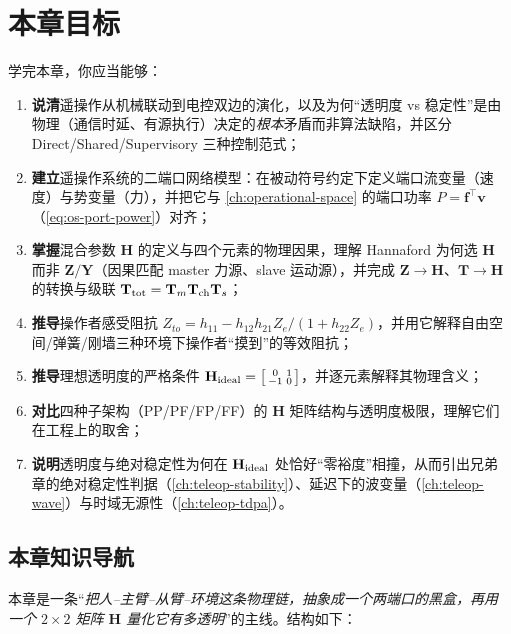 \section*{本章目标}
学完本章，你应当能够：
\begin{enumerate}
  \item \textbf{说清}遥操作从机械联动到电控双边的演化，以及为何“透明度 vs 稳定性”是由物理（通信时延、有源执行）决定的\emph{根本}矛盾而非算法缺陷，并区分 Direct/Shared/Supervisory 三种控制范式；
  \item \textbf{建立}遥操作系统的二端口网络模型：在被动符号约定下定义端口流变量（速度）与势变量（力），并把它与 \cref{ch:operational-space} 的端口功率 $P=\mathbf f^\top\mathbf v$（\cref{eq:os-port-power}）对齐；
  \item \textbf{掌握}混合参数 $\mathbf H$ 的定义与四个元素的物理因果，理解 Hannaford 为何选 $\mathbf H$ 而非 $\mathbf Z/\mathbf Y$（因果匹配 master 力源、slave 运动源），并完成 $\mathbf Z\to\mathbf H$、$\mathbf T\to\mathbf H$ 的转换与级联 $\mathbf T_{\rm tot}=\mathbf T_m\mathbf T_{\rm ch}\mathbf T_s$；
  \item \textbf{推导}操作者感受阻抗 $Z_{to}=h_{11}-h_{12}h_{21}Z_e/(1+h_{22}Z_e)$，并用它解释自由空间/弹簧/刚墙三种环境下操作者“摸到”的等效阻抗；
  \item \textbf{推导}理想透明度的严格条件 $\mathbf H_{\rm ideal}=\bigl[\begin{smallmatrix}0&1\\-1&0\end{smallmatrix}\bigr]$，并逐元素解释其物理含义；
  \item \textbf{对比}四种子架构（PP/PF/FP/FF）的 $\mathbf H$ 矩阵结构与透明度极限，理解它们在工程上的取舍；
  \item \textbf{说明}透明度与绝对稳定性为何在 $\mathbf H_{\rm ideal}$ 处恰好“零裕度”相撞，从而引出兄弟章的绝对稳定性判据（\cref{ch:teleop-stability}）、延迟下的波变量（\cref{ch:teleop-wave}）与时域无源性（\cref{ch:teleop-tdpa}）。
\end{enumerate}

\subsection*{本章知识导航}
本章是一条“\emph{把人--主臂--从臂--环境这条物理链，抽象成一个两端口的黑盒，再用一个 $2\times2$ 矩阵 $\mathbf H$ 量化它有多透明}”的主线。结构如下：

